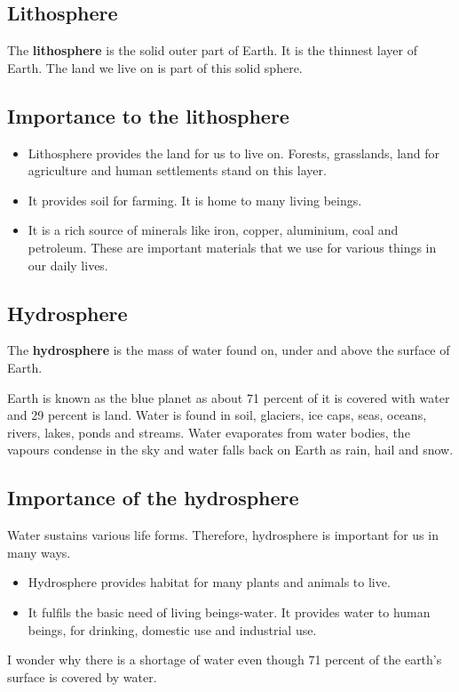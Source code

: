 \subsection{Lithosphere}
The \textbf{lithosphere} is the solid outer part of Earth. It is the thinnest layer of Earth. The land we live on is part of this solid sphere.
\subsection{\textbf{Importance to the lithosphere}}
\begin{itemize}
    \item Lithosphere provides the land for us to live on. Forests, grasslands, land for agriculture and human settlements stand on this layer.
    \item It provides soil for farming. It is home to many living beings.
    \item It is a rich source of minerals like iron, copper, aluminium, coal and petroleum. These are important materials that we use for various things in our daily lives.
\end{itemize}
\subsection{Hydrosphere}
The \textbf{hydrosphere} is the mass of water found on, under and above the surface of Earth.
\vspace{0.1in}
\par
Earth is known as the blue planet as about 71 percent of it is covered with water and 29 percent is land. Water is found in soil, glaciers, ice caps, seas, oceans, rivers, lakes, ponds and streams. Water evaporates from water bodies, the vapours condense in the sky and water falls back on Earth as rain, hail and snow.
\subsection{\textbf{Importance of the hydrosphere}}
Water sustains various life forms. Therefore, hydrosphere is important for us in many ways.
\begin{itemize}
    \item Hydrosphere provides habitat for many plants and animals to live.
    \item It fulfils the basic need of living beings-water. It provides water to human beings, for drinking, domestic use and industrial use.
\end{itemize}
\vspace{0.7in}
I wonder why there is a shortage of water even though 71 percent of the earth's surface is covered by water.
\vspace{0.4in}
